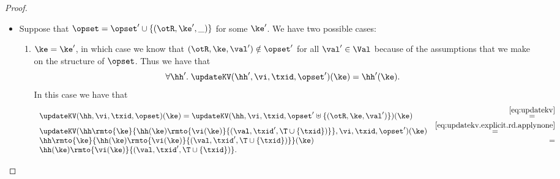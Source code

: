 \begin{proof}
\begin{enumerate}
\begin{itemize}
		\item Suppose that $\opset = \opset' \cup \{(\otR, \ke', \_)\}$ for some $\ke'$. We have two possible cases: 
			\begin{enumerate}
			\item $\ke = \ke'$, in which case we know that $(\otR, \ke, \val') \notin \opset'$ for all $\val' \in \Val$ because of 
			the assumptions that we make on the structure of $\opset$. Thus we have that 
			\begin{equation}
			\forall \hh'.\; \updateKV(\hh', \vi, \txid, \opset')(\ke) = \hh'(\ke).
			\label{eq:updatekv.explicit.rd.applynone}
			\end{equation}
			In this case we have that 
			\[
			\begin{array}{lr}
			\updateKV(\hh, \vi, \txid, \opset)(\ke) = \updateKV(\hh,\vi, \txid, \opset' \uplus \{(\otR, \ke, \val')\})(\ke) &\stackrel{\eqref{eq:updatekv}}{=}\\
			\updateKV(\hh\rmto{\ke}{\hh(\ke)\rmto{\vi(\ke)}{(\val, \txid', \T \cup \{\txid\})}}, \vi, \txid, \opset')(\ke) &\stackrel{\eqref{eq:updatekv.explicit.rd.applynone}}{=} \\
			\hh\rmto{\ke}{\hh(\ke)\rmto{\vi(\ke)}{(\val, \txid', \T \cup \{\txid\})}}(\ke) &=\\ 
			\hh(\ke)\rmto{\vi(\ke)}{(\val, \txid', \T \cup \{\txid\})}.
			\end{array}
			\]


\end{enumerate}
\end{itemize}
\end{enumerate}
\end{proof}

